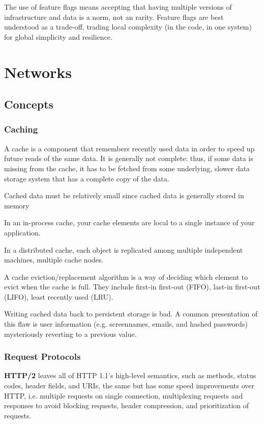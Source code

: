 \documentclass{article}
\begin{document}
    The use of feature flags means accepting that having multiple versions of infrastructure and data is a norm, not an rarity. Feature flags are best understood as a trade-off, trading local complexity (in the code, in one system) for global simplicity and resilience. 
    

\section{Networks}
    \subsection{Concepts}
    
    \subsubsection{Caching}
    A cache is a component that remembers recently used data in order to speed up future reads of the same data. It is generally not complete: thus, if some data is missing from the cache, it has to be fetched from some underlying, slower data storage system that has a complete copy of the data.
    
    Cached data must be relatively small since cached data is generally stored in memory
    
    In an in-process cache, your cache elements are local to a single instance of your application. 
    
    In a distributed cache, each object is replicated among multiple independent machines, multiple cache nodes.
    
    A cache eviction/replacement algorithm is a way of deciding which element to evict when the cache is full. They include first-in first-out (FIFO), last-in first-out (LIFO), least recently used (LRU).
    
    Writing cached data back to persistent storage is bad.  A common presentation of this flaw is user information (e.g. screennames, emails, and hashed passwords) mysteriously reverting to a previous value. 
    
    \subsubsection{Request Protocols}
    \textbf{HTTP/2} leaves all of HTTP 1.1's high-level semantics, such as methods, status codes, header fields, and URIs, the same but has some speed improvements over HTTP, i.e. multiple requests on single connection, multiplexing requests and responses to avoid blocking requests, header compression, and prioritization of requests.
    
\end{document}
